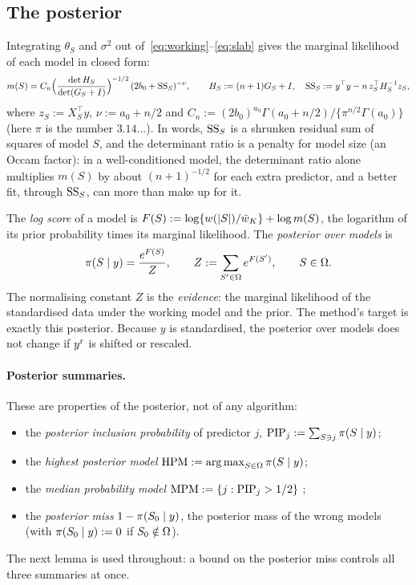 \subsection{The posterior}\label{sec:posterior}

Integrating $\theta_S$ and $\sigma^2$ out of~\eqref{eq:working}--\eqref{eq:slab} gives the marginal likelihood of each
model in closed form:
\begin{equation}\label{eq:marglik}
  m(S)=C_n\Big(\frac{\det H_S}{\det(G_S+I)}\Big)^{-1/2}\,(2b_0+\mathrm{SS}_S)^{-\nu},\qquad
  H_S:=(n+1)G_S+I,\quad \mathrm{SS}_S:=y^\top y-n\,z_S^\top H_S^{-1}z_S,
\end{equation}
where $z_S:=X_S^\top y$, $\nu:=a_0+n/2$ and $C_n:=(2b_0)^{a_0}\Gamma(a_0+n/2)/\{\pi^{n/2}\Gamma(a_0)\}$ (here $\pi$ is the
number $3.14\ldots$). In words, $\mathrm{SS}_S$ is a shrunken residual sum of squares of model $S$, and the determinant ratio is
a penalty for model size (an Occam factor): in a well-conditioned model, the determinant ratio alone multiplies $m(S)$ by
about $(n+1)^{-1/2}$ for each extra predictor, and a better fit, through $\mathrm{SS}_S$, can more than make up for it.

The \emph{log score} of a model is $F(S):=\log\{w(\lvert S\rvert)/\bar w_K\}+\log m(S)$, the logarithm of its prior probability
times its marginal likelihood. The \emph{posterior over models} is
\begin{equation}\label{eq:posterior}
  \pi(S\mid y)=\frac{e^{F(S)}}{Z},\qquad Z:=\sum_{S'\in\Omega}e^{F(S')},\qquad S\in\Omega .
\end{equation}
The normalising constant $Z$ is the \emph{evidence}: the marginal likelihood of the standardised data under the working
model and the prior. The method's target is exactly this posterior. Because $y$ is standardised, the posterior over models
does not change if $y^{\mathrm r}$ is shifted or rescaled.

\paragraph{Posterior summaries.} These are properties of the posterior, not of any algorithm:
\begin{itemize}[leftmargin=1.5em]
  \item the \emph{posterior inclusion probability} of predictor $j$, $\mathrm{PIP}_j:=\sum_{S\ni j}\pi(S\mid y)$;
  \item the \emph{highest posterior model} $\mathrm{HPM}:=\operatorname*{arg\,max}_{S\in\Omega}\pi(S\mid y)$;
  \item the \emph{median probability model} $\mathrm{MPM}:=\{j:\mathrm{PIP}_j>1/2\}$ \citep{BarbieriBerger2004};
  \item the \emph{posterior miss} $1-\pi(S_0\mid y)$, the posterior mass of the wrong models (with $\pi(S_0\mid y):=0$ if
    $S_0\notin\Omega$).
\end{itemize}
The next lemma is used throughout: a bound on the posterior miss controls all three summaries at once.

